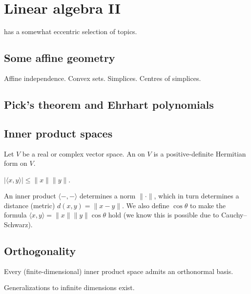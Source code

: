 \section{Linear algebra II}


\cite{Lax} has a somewhat eccentric selection of topics.

\subsection{Some affine geometry}

Affine independence. Convex sets. Simplices. Centres of simplices.

\subsection{Pick's theorem and Ehrhart polynomials}

\subsection{Inner product spaces}

\begin{definition}
Let $V$ be a real or complex vector space. An  on $V$ is a positive-definite Hermitian form on $V$.
\end{definition}

\begin{theorem}
$|\langle x,y \rangle| \leq \| x \| \| y \|$.
\end{theorem}

An inner product $\langle -,- \rangle$ determines a norm $\| \cdot \|$, which in turn determines a distance (metric) $d(x,y) = \| x-y \|$. We also define $\cos \theta$ to make the formula $\langle x,y \rangle = \| x \| \| y \| \cos \theta$ hold (we know this is possible due to Cauchy--Schwarz).

\subsection{Orthogonality}

\begin{theorem}
Every (finite-dimensional) inner product space admits an orthonormal basis.
\end{theorem}

Generalizations to infinite dimensions exist.

